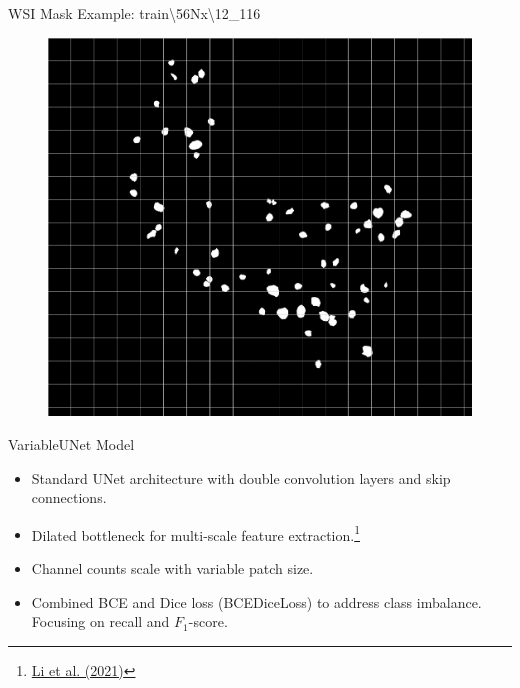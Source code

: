 \documentclass{beamer}
\begin{document}
\begin{frame}{WSI Mask Example: train\textbackslash56Nx\textbackslash12\_116}
    \begin{figure}
        \vspace{-0.14cm}
        \centering
        \includegraphics[height=0.877\textheight]{Images/mask_thumbnail_with_grid.png}
    \end{figure}

\end{frame}

\begin{frame}{VariableUNet Model}
    \begin{itemize}
        \item Standard UNet architecture with double convolution layers and skip connections.
        \item Dilated bottleneck for multi-scale feature extraction.\footnote{\href{https://doi.org/10.1117/1.JMI.8.6.067501}{Li et al. (2021)}}
        \item Channel counts scale with variable patch size.
        \item Combined BCE and Dice loss (BCEDiceLoss) to address class imbalance. Focusing on recall and $F_1$-score. 
    \end{itemize}
    
        
\end{frame}
\end{document}
